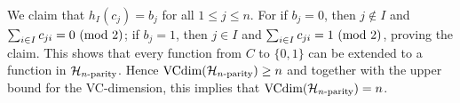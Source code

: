 We claim that $h_I(c_j) = b_j$ for all $1 \leq j \leq n$. For if $b_j = 0$, 
then $j \notin I$ and $\sum_{i \in I} c_{j i} = 0 \ (\mathrm{mod}\ 2)$; if $b_j = 1$,
then $j \in I$ and $\sum_{i \in I} c_{j i} = 1 \ (\mathrm{mod}\ 2)$, proving the claim. 
This shows that every function from $C$ to $\{0, 1\}$ can be extended to a function
in $\mathcal{H}_{n\text{-parity}}$. Hence $\text{VCdim} (\mathcal{H}_{n\text{-parity}}) \geq n$ and together with the upper 
bound for the VC-dimension, this implies that $\text{VCdim} (\mathcal{H}_{n\text{-parity}}) = n$. 
  

  

